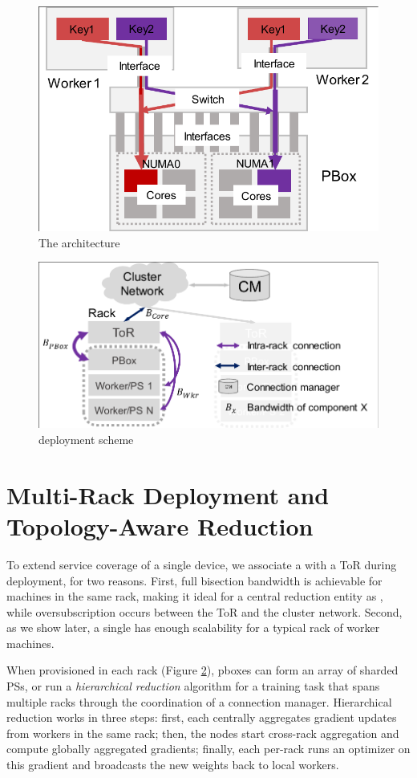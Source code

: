 \begin{figure}[t!]
	\centering
	\includegraphics[width=.6\linewidth,trim=2 1 1 1,clip]{Figures/PHubOverview.pdf}
	\caption{The \pbox architecture}
	\label{fig:phub}
\end{figure}



\begin{figure}[t!]
	\centering
	\includegraphics[width=.7\linewidth,trim=3 1 1 2,clip]{Figures/PBoxDeployment.pdf}
	\caption{\pbox deployment scheme}
	\label{fig:pBoxDeployment}
\end{figure}


\section{Multi-Rack Deployment and Topology-Aware Reduction}
\label{sec:hierarchicalReduction}
To extend service coverage of a single \pbox device, we associate a \pbox with a ToR during deployment, for two reasons. First, full bisection bandwidth is achievable for machines in the same rack, making it ideal for a central reduction entity as \pbox, while oversubscription occurs between the ToR and the cluster network. Second, as we show later, a single \pbox has enough scalability for a typical rack of worker machines.

When provisioned in each rack (Figure \ref{fig:pBoxDeployment}), pbox{}es can form an array of sharded PSs, or run a \textit{hierarchical reduction} algorithm for a training task that spans multiple racks through the coordination of a connection manager. Hierarchical reduction works in three steps: first, each \pbox centrally aggregates gradient updates from workers in the same rack; then, the \pbox{} nodes start cross-rack aggregation and compute globally aggregated gradients; finally, each per-rack \pbox runs an optimizer on this gradient and broadcasts the new weights back to local workers.

